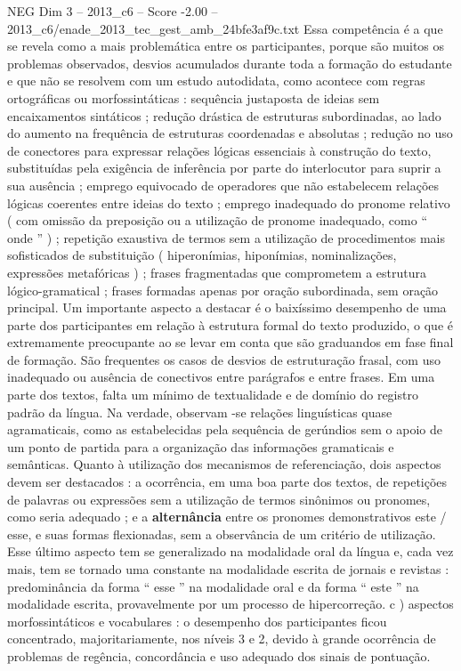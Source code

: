 \begin{textsample}{NEG Dim 3 – 2013\_c6 – Score -2.00 – 2013\_c6/enade\_2013\_tec\_gest\_amb\_24bfe3af9c.txt}
Essa competência é a que se revela como a mais problemática entre os participantes, porque são muitos os problemas observados, desvios acumulados durante toda a formação do estudante e que não se resolvem com um estudo autodidata, como acontece com regras ortográficas ou morfossintáticas : sequência justaposta de ideias sem encaixamentos sintáticos ; redução drástica de estruturas subordinadas, ao lado do aumento na frequência de estruturas coordenadas e absolutas ; redução no uso de conectores para expressar relações lógicas essenciais à construção do texto, substituídas pela exigência de inferência por parte do interlocutor para suprir a sua ausência ; emprego equivocado de operadores que não estabelecem relações lógicas coerentes entre ideias do texto ; emprego inadequado do pronome relativo ( com omissão da preposição ou a utilização de pronome inadequado, como “ onde ” ) ; repetição exaustiva de termos sem a utilização de procedimentos mais sofisticados de substituição ( hiperonímias, hiponímias, nominalizações, expressões metafóricas ) ; frases fragmentadas que comprometem a estrutura lógico-gramatical ; frases formadas apenas por oração subordinada, sem oração principal.
Um importante aspecto a destacar é o baixíssimo desempenho de uma parte dos participantes em relação à estrutura formal do texto produzido, o que é extremamente preocupante ao se levar em conta que são graduandos em fase final de formação.
São frequentes os casos de desvios de estruturação frasal, com uso inadequado ou ausência de conectivos entre parágrafos e entre frases.
Em uma parte dos textos, falta um mínimo de textualidade e de domínio do registro padrão da língua.
Na verdade, observam -se relações linguísticas quase agramaticais, como as estabelecidas pela sequência de gerúndios sem o apoio de um ponto de partida para a organização das informações gramaticais e semânticas.
Quanto à utilização dos mecanismos de referenciação, dois aspectos devem ser destacados : a ocorrência, em uma boa parte dos textos, de repetições de palavras ou expressões sem a utilização de termos sinônimos ou pronomes, como seria adequado ; e a \textbf{alternância} entre os pronomes demonstrativos este / esse, e suas formas flexionadas, sem a observância de um critério de utilização.
Esse último aspecto tem se generalizado na modalidade oral da língua e, cada vez mais, tem se tornado uma constante na modalidade escrita de jornais e revistas : predominância da forma “ esse ” na modalidade oral e da forma “ este ” na modalidade escrita, provavelmente por um processo de hipercorreção. c ) aspectos morfossintáticos e vocabulares : o desempenho dos participantes ficou concentrado, majoritariamente, nos níveis 3 e 2, devido à grande ocorrência de problemas de regência, concordância e uso adequado dos sinais de pontuação.

\end{textsample}
